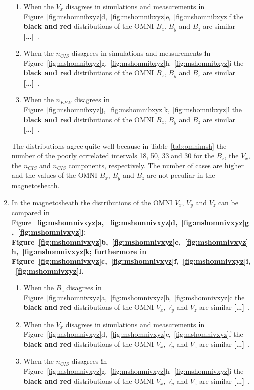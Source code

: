 \documentclass[linenumbers,draft]{agujournal}
\newcommand{\del}{\textbf{[\dots]}\ } %
\begin{document}
\begin{enumerate}
\begin{enumerate}
\item When the $V_{x}$ disagrees in simulations and measurements \textbf{i}n Figure~\ref{fig:mshomnibxyz}d,~\ref{fig:mshomnibxyz}e,~\ref{fig:mshomnibxyz}f the \textbf{black and red} distributions of the OMNI $B_{x}$, $B_{y}$ and $B_{z}$ are similar \del . 
  
\item When the $n_{CIS}$ disagrees in simulations and measurements \textbf{i}n Figure~\ref{fig:mshomnibxyz}g,~\ref{fig:mshomnibxyz}h,~\ref{fig:mshomnibxyz}i the \textbf{black and red} distributions of the OMNI $B_{x}$, $B_{y}$ and $B_{z}$ are similar \del.

\item When the $n_{EFW}$ disagrees \textbf{i}n Figure~\ref{fig:mshomnibxyz}j,~\ref{fig:mshomnibxyz}k,~\ref{fig:mshomnibxyz}l the \textbf{black and red} distributions of the OMNI $B_{x}$, $B_{y}$ and $B_{z}$ are similar \del.
\end{enumerate}
The distributions agree quite well because in Table~\ref{tab:omnimsh} the number of the poorly correlated intervals 18, 50, 33 and 30 for the $B_{z}$, the $V_{x}$, the $n_{CIS}$ and $n_{CIS}$ components, respectively. The number of cases are higher and the values of the OMNI $B_{x}$, $B_{y}$ and $B_{z}$ are not peculiar in the magnetosheath.

\item In the magnetosheath the distributions of the OMNI $V_{x}$, $V_{y}$ and $V_{z}$ can be compared \textbf{i}n Figure~\textbf{\ref{fig:mshomnivxyz}a,~\ref{fig:mshomnivxyz}d,~\ref{fig:mshomnivxyz}g,~\ref{fig:mshomnivxyz}j; Figure~\ref{fig:mshomnivxyz}b,~\ref{fig:mshomnivxyz}e,~\ref{fig:mshomnivxyz}h,~\ref{fig:mshomnivxyz}k; furthermore \textbf{i}n Figure~\ref{fig:mshomnivxyz}c,~\ref{fig:mshomnivxyz}f,~\ref{fig:mshomnivxyz}i,~\ref{fig:mshomnivxyz}l.}
\begin{enumerate}
\item When the $B_{z}$ disagrees \textbf{i}n Figure~\ref{fig:mshomnivxyz}a,~\ref{fig:mshomnivxyz}b,~\ref{fig:mshomnivxyz}c the \textbf{black and red }distributions of the OMNI $V_{x}$, $V_{y}$ and $V_{z}$ are similar \del .

\item When the $V_{x}$ disagrees in simulations and measurements \textbf{i}n Figure~\ref{fig:mshomnivxyz}d,~\ref{fig:mshomnivxyz}e,~\ref{fig:mshomnivxyz}f the \textbf{black and red} distributions of the OMNI $V_{x}$, $V_{y}$ and $V_{z}$ are similar \del .

\item When the $n_{CIS}$ disagrees \textbf{i}n Figure~\ref{fig:mshomnivxyz}g,~\ref{fig:mshomnivxyz}h,~\ref{fig:mshomnivxyz}i the \textbf{black and red} distributions of the OMNI $V_{x}$, $V_{y}$ and $V_{z}$ are similar \del.


\end{enumerate}
\end{enumerate}
\end{document}

